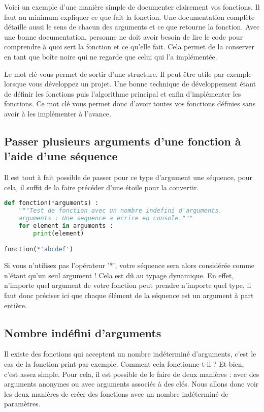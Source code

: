 \documentclass[a4paper,twoside]{article}
\begin{document}
Voici un exemple d'une manière simple de documenter clairement vos fonctions. Il faut au minimum expliquer ce que fait la fonction. Une documentation complète détaille aussi le sens de chacun des arguments et ce que retourne la fonction. Avec une bonne documentation, personne ne doit avoir besoin de lire le code pour comprendre à quoi sert la fonction et ce qu'elle fait. Cela permet de la conserver en tant que boîte noire qui ne regarde que celui qui l'a implémentée.

\begin{remarque}
Le mot clé  vous permet de sortir d'une structure. Il peut être utile par exemple lorsque vous développez un projet. Une bonne technique de développement étant de définir les fonctions puis l'algorithme principal et enfin d'implémenter les fonctions. Ce mot clé vous permet donc d'avoir toutes vos fonctions définies sans avoir à les implémenter à l'avance.
\end{remarque}

\subsection{Passer plusieurs arguments d'une fonction à l'aide d'une séquence}\label{sec:args_liste}
Il est tout à fait possible de passer pour ce type d'argument une séquence, pour cela, il suffit de la faire précéder d'une étoile pour la convertir.

\begin{lstlisting}[language=python]
def fonction(*arguments) :
    """Test de fonction avec un nombre indefini d'arguments.
    arguments : Une sequence a ecrire en console."""
    for element in arguments :
        print(element)

fonction(*'abcdef')
\end{lstlisting}

Si vous n'utilisez pas l'opérateur '*', votre séquence sera alors considérée comme n'étant qu'un seul argument ! Cela est dû au typage dynamique. En effet, n'importe quel argument de votre fonction peut prendre n'importe quel type, il faut donc préciser ici que chaque élément de la séquence est un argument à part entière.

\subsection{Nombre indéfini d'arguments}

Il existe des fonctions qui acceptent un nombre indéterminé d'arguments, c'est le cas de la fonction print par exemple. Comment cela fonctionne-t-il ? Et bien, c'est assez simple. Pour cela, il est possible de le faire de deux manières : avec des arguments anonymes ou avec arguments associés à des clés. Nous allons donc voir les deux manières de créer des fonctions avec un nombre indéterminé de paramètres.
\end{document}
